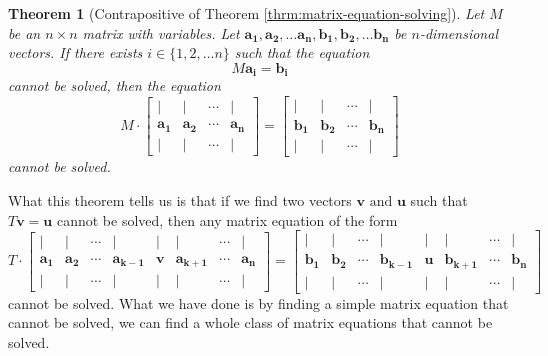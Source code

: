 \documentclass[a4paper,10pt]{article}
\theoremstyle{plain}
\newtheorem{Theorem}{Theorem}
\theoremstyle{definition}
\theoremstyle{remark}
\renewcommand{\vec}[1]{\mathbf{#1}}
\begin{document}
\begin{Theorem}[Contrapositive of Theorem \ref{thrm:matrix-equation-solving}]
	Let \( M \) be an \( n \times n \) matrix with variables.
	Let \( \vec{a_1}, \vec{a_2}, \dots \vec{a_n}, \vec{b_1}, \vec{b_2}, \dots \vec{b_n} \) be \( n \)-dimensional vectors.
	If there exists \( i \in \{1, 2, \dots n\} \) such that the equation \[M\vec{a_i} = \vec{b_i}\] cannot be solved,
	then the equation \[
	M
	\cdot
	\begin{bmatrix}
		| & | & \cdots & |\\
		\vec{a_1} & \vec{a_2} & \cdots & \vec{a_n} \\
		| & | & \cdots & |
	\end{bmatrix}
	=
	\begin{bmatrix}
		| & | & \cdots & |\\
		\vec{b_1} & \vec{b_2} & \cdots & \vec{b_n} \\
		| & | & \cdots & |
	\end{bmatrix}
	\]
	cannot be solved.
\end{Theorem}
What this theorem tells us is that if we find two vectors \( \vec{v} \text{ and } \vec{u} \) such that \( T\vec{v} = \vec{u} \) cannot be solved,
then any matrix equation of the form \[
	T
	\cdot
	\begin{bmatrix}
		| & | & \cdots & | & | & | & \cdots & |\\
		\vec{a_1} & \vec{a_2} & \cdots & \vec{a_{k-1}} & \vec{v} & \vec{a_{k+1}} & \cdots & \vec{a_n} \\
		| & | & \cdots & | & | & | & \cdots & |
	\end{bmatrix}
	=
	\begin{bmatrix}
		| & | & \cdots & | & | & | & \cdots & |\\
		\vec{b_1} & \vec{b_2} & \cdots & \vec{b_{k-1}} & \vec{u} & \vec{b_{k+1}} & \cdots & \vec{b_n} \\
		| & | & \cdots & | & | & | & \cdots & |
	\end{bmatrix}
	\]
cannot be solved.
What we have done is by finding a simple matrix equation that cannot be solved, we can find a whole class of matrix equations that cannot be solved.

\end{document}
